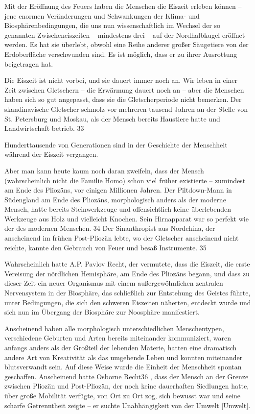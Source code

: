 \documentclass[11pt,a4paper]{book}
\begin{document}
Mit der Eröffnung des Feuers haben die Menschen die Eiszeit erleben können -- jene enormen Veränderungen und Schwankungen der Klima- und Biosphärenbedingungen, die uns nun wissenschaftlich im Wechsel der so genannten Zwischeneiszeiten -- mindestens drei -- auf der Nordhalbkugel eröffnet werden. Es hat sie überlebt, obwohl eine Reihe anderer großer Säugetiere von der Erdoberfläche verschwunden sind. Es ist möglich, dass er zu ihrer Ausrottung beigetragen hat. 

Die Eiszeit ist nicht vorbei, und sie dauert immer noch an. Wir leben in einer Zeit zwischen Gletschern -- die Erwärmung dauert noch an -- aber die Menschen haben sich so gut angepasst, dass sie die Gletscherperiode nicht bemerken. Der skandinavische Gletscher schmolz vor mehreren tausend Jahren an der Stelle von St. Petersburg und Moskau, als der Mensch bereits Haustiere hatte und Landwirtschaft betrieb. 33 

Hunderttausende von Generationen sind in der Geschichte der Menschheit während der Eiszeit vergangen. 

Aber man kann heute kaum noch daran zweifeln, dass der Mensch (wahrscheinlich nicht die Familie Homo) schon viel früher existierte -- zumindest am Ende des Pliozäns, vor einigen Millionen Jahren. Der Piltdown-Mann in Südengland am Ende des Pliozäns, morphologisch anders als der moderne Mensch, hatte bereits Steinwerkzeuge und offensichtlich keine überlebenden Werkzeuge aus Holz und vielleicht Knochen. Sein Hirnapparat war so perfekt wie der des modernen Menschen. 34 Der Sinanthropist aus Nordchina, der anscheinend im frühen Post-Pliozän lebte, wo der Gletscher anscheinend nicht reichte, kannte den Gebrauch von Feuer und besaß Instrumente. 35 

Wahrscheinlich hatte A.P. Pavlov Recht, der vermutete, dass die Eiszeit, die erste Vereisung der nördlichen Hemisphäre, am Ende des Pliozäns begann, und dass zu dieser Zeit ein neuer Organismus mit einem außergewöhnlichen zentralen Nervensystem in der Biosphäre, das schließlich zur Entstehung des Geistes führte, unter Bedingungen, die sich den schweren Eiszeiten näherten, entdeckt wurde und sich nun im Übergang der Biosphäre zur Noosphäre manifestiert. 

Anscheinend haben alle morphologisch unterschiedlichen Menschentypen, verschiedene Geburten und Arten bereits miteinander kommuniziert, waren anfangs anders als der Großteil der lebenden Materie, hatten eine dramatisch andere Art von Kreativität als das umgebende Leben und konnten miteinander blutsverwandt sein. Auf diese Weise wurde die Einheit der Menschheit spontan geschaffen. Anscheinend hatte Osborne Recht36 , dass der Mensch an der Grenze zwischen Pliozän und Post-Pliozän, der noch keine dauerhaften Siedlungen hatte, über große Mobilität verfügte, von Ort zu Ort zog, sich bewusst war und seine scharfe Getrenntheit zeigte -- er suchte Unabhängigkeit von der Umwelt [Umwelt]. 
\end{document}
